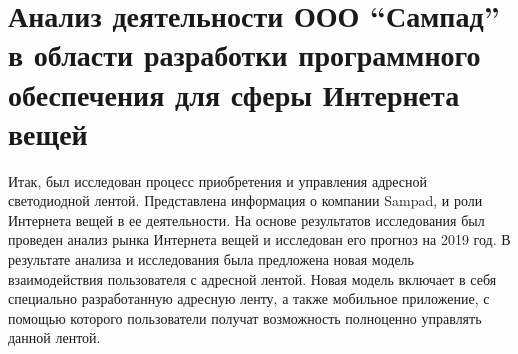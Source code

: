 \section{Анализ деятельности ООО \enquote{Сампад} в области разработки программного обеспечения для сферы Интернета вещей}
\label{sec:analysis}









Итак, был исследован процесс приобретения и управления адресной светодиодной лентой. Представлена информация о компании Sampad, и роли Интернета вещей в ее деятельности. На основе результатов исследования был проведен анализ рынка Интернета вещей и исследован его прогноз на 2019 год. В результате анализа и исследования была предложена новая модель взаимодействия пользователя с адресной лентой. Новая модель включает в себя специально разработанную адресную ленту, а также мобильное приложение, с помощью которого пользователи получат возможность полноценно управлять данной лентой.
